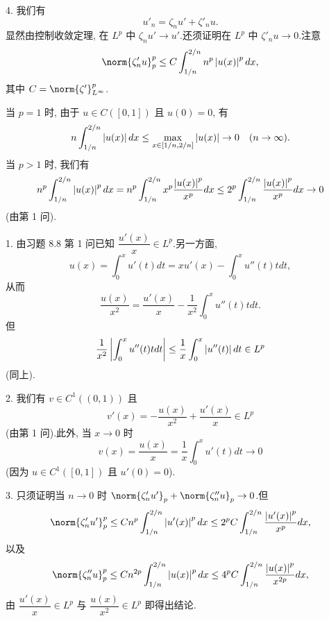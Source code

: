 4. 我们有
\begin{equation*}
u'_n=\zeta_nu'+\zeta'_nu.
\end{equation*}
显然由控制收敛定理, 在 $L^p$ 中 $\zeta_nu'\to u'$.还须证明在 $L^p$ 中
$\zeta'_nu\to0$.注意
\begin{equation*}
\norm{\zeta'_nu}_p^p\le C\int_{1/n}^{2/n}n^p\abs{u(x)}^pdx,
\end{equation*}
其中 $C=\norm{\zeta'}_{L^\infty}^p$.

当 $p=1$ 时, 由于 $u\in C([0,1])$ 且 $u(0)=0$, 有
\begin{equation*}
n\int_{1/n}^{2/n}\left|u(x)\right|dx\le\max_{x\in[1/n,2/n]}\left|u(x)\right|\to0\quad(n\to\infty).
\end{equation*}
当 $p>1$ 时, 我们有
\begin{equation*}
n^p\int_{1/n}^{2/n}\left|u(x)\right|^pdx=n^p\int_{1/n}^{2/n}x^p\frac{\left|u(x)\right|^p}{x^p}dx
\le2^p\int_{1/n}^{2/n}\frac{\left|u(x)\right|^p}{x^p}dx\to0
\end{equation*}
(由第 1 问).


1. 由习题 8.8 第 1 问已知 $\dfrac{u'(x)}{x}\in L^p$.另一方面,
\begin{equation*}
u(x)=\int_0^xu'(t)dt=xu'(x)-\int_0^xu''(t)tdt,
\end{equation*}
从而
\begin{equation*}
\frac{u(x)}{x^2}=\frac{u'(x)}{x}-\frac{1}{x^2}\int_0^xu''(t)tdt.
\end{equation*}
但
\begin{equation*}
\frac{1}{x^2}\left|\int_0^xu''(t)tdt\right|\le\frac1x\int_0^x\left|u''(t)\right|dt\in L^p
\end{equation*}
(同上).

2. 我们有 $v\in C^1((0,1))$ 且
\begin{equation*}
v'(x)=-\frac{u(x)}{x^2}+\frac{u'(x)}{x}\in L^p
\end{equation*}
(由第 1 问).此外, 当 $x\to0$ 时
\begin{equation*}
v(x)=\frac{u(x)}{x}=\frac1x\int_0^xu'(t)dt\to0
\end{equation*}
(因为 $u\in C^1([0,1])$ 且 $u'(0)=0$).

3. 只须证明当 $n\to0$ 时 $\norm{\zeta'_nu'}_p+\norm{\zeta''_nu}_p\to0$.但
\begin{equation*}
\norm{\zeta'_nu'}_p^p\le Cn^p\int_{1/n}^{2/n}\abs{u'(x)}^pdx
\le2^pC\int_{1/n}^{2/n}\frac{\abs{u'(x)}^p}{x^p}dx,
\end{equation*}
以及
\begin{equation*}
\norm{\zeta''_nu}_p^p\le Cn^{2p}\int_{1/n}^{2/n}\abs{u(x)}^pdx
\le4^pC\int_{1/n}^{2/n}\frac{\abs{u(x)}^p}{x^{2p}}dx,
\end{equation*}
由 $\dfrac{u'(x)}{x}\in L^p$ 与 $\dfrac{u(x)}{x^2}\in L^p$ 即得出结论.

